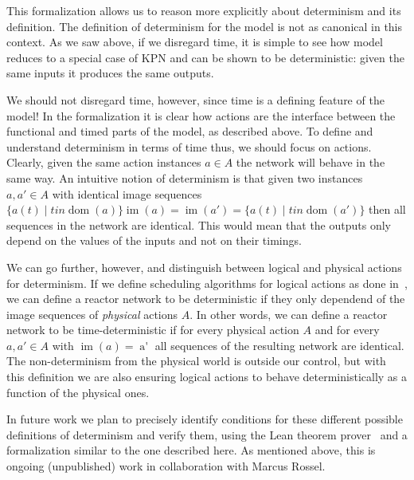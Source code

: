 This formalization allows us to reason more explicitly about determinism and its definition.
The definition of determinism for the model is not as canonical in this context.
As we saw above, if we disregard time, it is simple to see how model reduces to a special case of \ac{KPN} and can be shown to be deterministic: given the same inputs it produces the same outputs.

We should not disregard time, however, since time is a defining feature of the model!
In the formalization it is clear how actions are the interface between the functional and timed parts of the model, as described above.
To define and understand determinism in terms of time thus, we should focus on actions.
Clearly, given the same action instances $a \in A$ the network will behave in the same way.
An intuitive notion of determinism is that given two instances $a, a' \in A$ with identical image sequences $\{ a(t) \mid t in \operatorname{dom}(a) \} \operatorname{im}(a) = \operatorname{im}(a') = \{ a(t) \mid t in \operatorname{dom}(a') \}$ then all sequences in the network are identical.
This would mean that the outputs only depend on the values of the inputs and not on their timings.

We can go further, however, and distinguish between logical and physical actions for determinism. 
If we define scheduling algorithms for logical actions as done in~\cite{lohstroh_cyphy19,lohstroh_phdthesis}, we can define a reactor network to be deterministic if they only dependend of the image sequences of \emph{physical} actions $A$.
In other words, we can define a reactor network to be time-deterministic if for every physical action $A$ and for every $a, a' \in A$ with $\operatorname{im}(a) = \operatorname{a'}$ all sequences of the resulting network are identical.
The non-determinism from the physical world is outside our control, but with this definition we are also ensuring logical actions to behave deterministically as a function of the physical ones. 

In future work we plan to precisely identify conditions for these different possible definitions of determinism and verify them, using the Lean theorem prover~\cite{lean} and a formalization similar to the one described here.
As mentioned above, this is ongoing (unpublished) work in collaboration with Marcus Rossel.